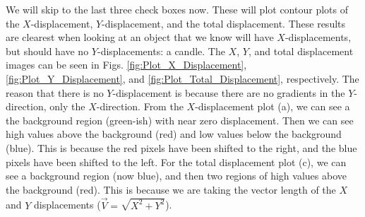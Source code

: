 \documentclass[letterpaper,12pt]{article}
\begin{document}
We will skip to the last three check boxes now.  These will plot contour plots of the $X$-displacement, $Y$-displacement, and the total displacement.  These results are clearest when looking at an object that we know will have $X$-displacements, but should have no $Y$-displacements: a candle.  The $X$, $Y$, and total displacement images can be seen in Figs. \ref{fig:Plot_X_Displacement}, \ref{fig:Plot_Y_Displacement}, and \ref{fig:Plot_Total_Displacement}, respectively.  The reason that there is no $Y$-displacement is because there are no gradients in the $Y$-direction, only the $X$-direction.  From the $X$-displacement plot (a), we can see a the background region (green-ish) with near zero displacement.  Then we can see high values above the background (red) and low values below the background (blue).  This is because the red pixels have been shifted to the right, and the blue pixels have been shifted to the left.  For the total displacement plot (c), we can see a background region (now blue), and then two regions of high values above the background (red).  This is because we are taking the vector length of the $X$ and $Y$ displacements ($\vec{V} = \sqrt{X^2 + Y^2}$).
\end{document}
